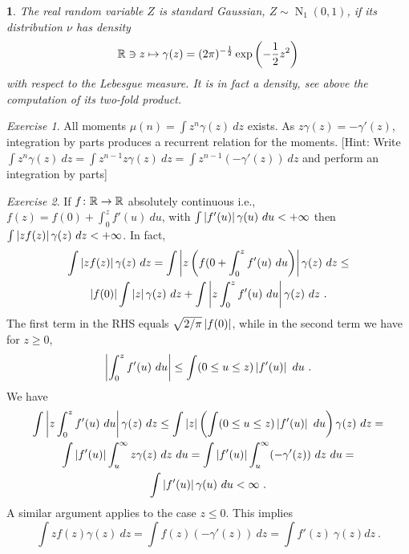 \documentclass[12pt,a4paper]{amsart}
\newcommand{\gaussian}[3]{\operatorname{N}_{#1}\left(#2,#3\right)}
\theoremstyle{plain}%
\newtheorem{npar}{}%
\theoremstyle{definition}
\theoremstyle{remark}
\newtheorem{exercise}{Exercise}
\begin{document}
\begin{npar}\normalfont  The real random variable $Z$ is \emph{standard Gaussian}, $Z \sim \gaussian 1 0 1$, if its distribution $\nu$ has density
  \begin{equation*}
    \mathbb{R} \ni z \mapsto \gamma(z) = (2\pi)^{-\frac12} \exp\left(-\frac12 z^2\right)
  \end{equation*}
%
  with respect to the Lebesgue measure. It is in fact a density, see above the computation of its two-fold product.
\end{npar}
  \begin{exercise}
All moments $\mu(n) = \int z^n\gamma(z) \ dz$ exists. As $z\gamma(z) = -\gamma'(z)$, integration by parts produces a recurrent relation for the moments. [Hint: Write $\int z^n \gamma(z) \ dz = \int z^{n-1} z \gamma(z) \ dz = \int z^{n-1} (-\gamma'(z)) \  dz$ and perform an integration by parts]
\end{exercise}

\begin{exercise}  If $f \colon \mathbb{R} \to \mathbb{R}$ absolutely continuous i.e., $f(z) = f(0) + \int_0^z f'(u) \ du$, with
$\int \left\vert f'(u)\right\vert \gamma(u) \ du < +\infty$ then
$\int \left\vert zf(z)\right\vert\gamma(z) \ dz < +\infty$. In fact,
\begin{multline*}
  \int \left\vert zf(z)\right\vert\gamma(z) \ dz = \int \left\vert z\left(f(0 + \int_0^z f'(u) \ du \right)\right\vert\gamma(z) \ dz \le \\ \left\vert f(0)\right\vert \int \left\vert z\right\vert \gamma(z) \ dz + \int \left\vert z \int_0^z f'(u) \ du\right\vert \gamma(z) \ dz \ .
\end{multline*}
The first term in the RHS equals $\sqrt{2/\pi} \left\vert f(0)\right\vert$, while in the second term we have for $z \ge 0$,
\begin{equation*}
  \left\vert\int_0^z f'(u) \ du\right\vert \le \int (0 \leq u \leq z)\left\vert f'(u)\right\vert \ du \ .
\end{equation*}
We have
\begin{multline*}
  \int \left\vert z \int_0^z f'(u) \ du\right\vert \gamma(z) \ dz \leq \int \left\vert z\right\vert \left(\int (0 \leq u \leq z) \left\vert f'(u)\right\vert \ du \right) \gamma(z) \ dz = \\ \int \left\vert f'(u)\right\vert \int_u^\infty z \gamma(z) \ dz \ du = \int \left\vert f'(u)\right\vert \int_u^\infty (-\gamma'(z)) \ dz \ du = \\
  \int \left\vert f'(u)\right\vert \gamma(u) \ du < \infty \ .
\end{multline*}
A similar argument applies to the case $z \le 0$. This implies
\begin{equation*}
  \int zf(z) \gamma(z) \ dz = \int f(z) (-\gamma'(z)) \  dz = \int f'(z) \ \gamma(z)dz \ .
\end{equation*}
\end{exercise}
\end{document}
